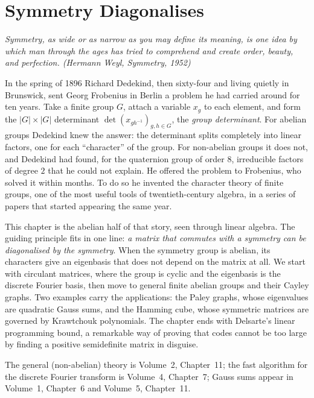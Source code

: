 \chapter{Symmetry Diagonalises}\label{linear:ch:symmetry}

\begin{center}\itshape
Symmetry, as wide or as narrow as you may define its meaning, is one idea by which man through the ages has tried to comprehend
and create order, beauty, and perfection.
\upshape(Hermann Weyl, \emph{Symmetry}, 1952)
\end{center}

In the spring of 1896 Richard Dedekind, then sixty-four and living quietly in Brunswick, sent Georg Frobenius in Berlin a problem
he had carried around for ten years. Take a finite group $G$, attach a variable $x_g$ to each element, and form the $|G|\times|G|$
determinant $\det(x_{gh^{-1}})_{g,h\in G}$, the \emph{group determinant}. For abelian groups Dedekind knew the answer: the
determinant splits completely into linear factors, one for each ``character'' of the group. For non-abelian groups it does not,
and Dedekind had found, for the quaternion group of order $8$, irreducible factors of degree $2$ that he could not explain. He
offered the problem to Frobenius, who solved it within months. To do so he invented the character theory of finite groups, one
of the most useful tools of twentieth-century algebra, in a series of papers that started appearing the same year.

This chapter is the abelian half of that story, seen through linear algebra. The guiding principle fits in one line:
\emph{a matrix that commutes with a symmetry can be diagonalised by the symmetry}. When the symmetry group is abelian, its
characters give an eigenbasis that does not depend on the matrix at all. We start with circulant matrices, where the group is
cyclic and the eigenbasis is the discrete Fourier basis, then move to general finite abelian groups and their Cayley graphs.
Two examples carry the applications: the Paley graphs, whose eigenvalues are quadratic Gauss sums, and the Hamming cube, whose
symmetric matrices are governed by Krawtchouk polynomials. The chapter ends with Delsarte's linear programming bound, a
remarkable way of proving that codes cannot be too large by finding a positive semidefinite matrix in disguise.

The general (non-abelian) theory is Volume~2, Chapter~11; the fast algorithm for the discrete Fourier transform is Volume~4,
Chapter~7; Gauss sums appear in Volume~1, Chapter~6 and Volume~5, Chapter~11.

